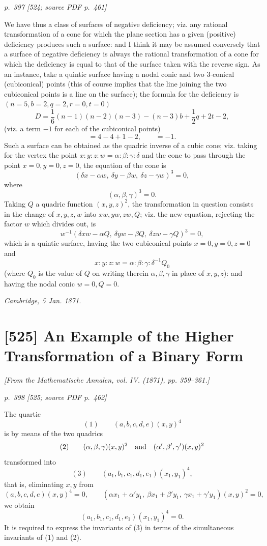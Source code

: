 \documentclass[11pt,a4paper]{article}
\newcommand{\pagemarker}[3]{\par\bigskip\noindent\textit{p.~#1 [#2; source PDF p.~#3]}\par\smallskip}
\begin{document}
\pagemarker{397}{524}{461}

We have thus a class of surfaces of negative deficiency; viz. any rational
transformation of a cone for which the plane section has a given (positive)
deficiency produces such a surface: and I think it may be assumed conversely that a
surface of negative deficiency is always the rational transformation of a cone for which
the deficiency is equal to that of the surface taken with the reverse sign. As an
instance, take a quintic surface having a nodal conic and two 3-conical
(cubiconical) points (this of course implies that the line joining the two cubiconical
points is a line on the surface); the formula for the deficiency is
$(n=5,b=2,q=2,r=0,t=0)$
\[
D=\frac16(n-1)(n-2)(n-3)-(n-3)b+\frac12q+2t-2,
\]
(viz. a term $-1$ for each of the cubiconical points)
\[
=4-4+1-2,\qquad =-1.
\]
Such a surface can be obtained as the quadric inverse of a cubic cone; viz. taking for
the vertex the point $x:y:z:w=\alpha:\beta:\gamma:\delta$ and the cone to pass through
the point $x=0,y=0,z=0$, the equation of the cone is
\[
(\delta x-\alpha w,\ \delta y-\beta w,\ \delta z-\gamma w)^3=0,
\]
where
\[
(\alpha,\beta,\gamma)^3=0.
\]
Taking $Q$ a quadric function $(x,y,z)^2$, the transformation in question consists in
the change of $x,y,z,w$ into $xw,yw,zw,Q$; viz. the new equation, rejecting the factor
$w$ which divides out, is
\[
w^{-1}(\delta xw-\alpha Q,\ \delta yw-\beta Q,\ \delta zw-\gamma Q)^3=0,
\]
which is a quintic surface, having the two cubiconical points $x=0,y=0,z=0$ and
\[
x:y:z:w=\alpha:\beta:\gamma:\delta^{-1}Q_0
\]
(where $Q_0$ is the value of $Q$ on writing therein $\alpha,\beta,\gamma$ in place of
$x,y,z$): and having the nodal conic $w=0,Q=0$.

\noindent\textit{Cambridge, 5 Jan. 1871.}

\clearpage
\section*{[525] An Example of the Higher Transformation of a Binary Form}
\begin{center}
\textit{[From the Mathematische Annalen, vol. IV. (1871), pp. 359--361.]}
\end{center}

\pagemarker{398}{525}{462}

The quartic
\[
(1)\qquad (a,b,c,d,e)(x,y)^4
\]
is by means of the two quadrics
\[
(2)\qquad (\alpha,\beta,\gamma)(x,y)^2
\quad\hbox{and}\quad
(\alpha',\beta',\gamma')(x,y)^2
\]
transformed into
\[
(3)\qquad (a_1,b_1,c_1,d_1,e_1)(x_1,y_1)^4,
\]
that is, eliminating $x,y$ from
\[
(a,b,c,d,e)(x,y)^4=0,\qquad
(\alpha x_1+\alpha' y_1,\ \beta x_1+\beta' y_1,\ \gamma x_1+\gamma' y_1)(x,y)^2=0,
\]
we obtain
\[
(a_1,b_1,c_1,d_1,e_1)(x_1,y_1)^4=0.
\]
It is required to express the invariants of (3) in terms of the simultaneous invariants
of (1) and (2).
\end{document}
